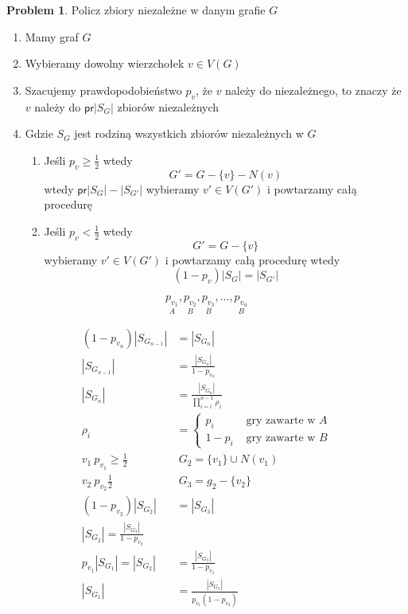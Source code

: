 \documentclass[a4paper,12pt]{article}
\theoremstyle{definition}%
\theoremstyle{definition}
\theoremstyle{problem}
\newtheorem*{problem*}{Problem}
\begin{document}
\begin{problem*}
Policz zbiory niezależne w danym grafie $G$
\begin{enumerate}
\item Mamy graf $G$
\item Wybieramy dowolny wierzchołek $v\in V(G)$
\item Szacujemy prawdopodobieństwo $p_v$, że $v$ należy do niezależnego, to znaczy że $v$ należy do $\mathsf{pr}|S_G|$ zbiorów niezależnych \
\item Gdzie $S_G$ jest rodziną wszystkich zbiorów niezależnych w $G$
\begin{enumerate}[label=\Alph*)]
\item Jeśli $p_v\geq \frac{1}{2}$ wtedy $$G'=G- \{v\}-N(v)$$ wtedy $\mathsf{pr}|S_G|-|S_{G'}|$ wybieramy $v'\in V(G')$ i powtarzamy całą procedurę
\item Jeśli $p_v < \frac{1}{2}$ wtedy $$G'=G- \{v\}$$ wybieramy $v'\in V(G')$ i powtarzamy całą procedurę wtedy $$(1-p_v)|S_G|=|S_{G'}|$$
\end{enumerate}
\end{enumerate}
$$\underset{A}{p_{v_1}},\underset{B}{p_{v_2}},\underset{B}{p_{v_3}},...,\underset{B}{p_{v_n}}$$
\begin{figure}[H]
\centering
{}
\end{figure}
\begin{align*}
(1-p_{v_n})|S_{G_{n-1}}|&=|S_{G_n}|\\
|S_{G_{n-1}}|&=\frac{|S_{G_n}|}{1-p_{v_n}}\\
|S_{G_n}|&=\frac{|S_{G_n}|}{\prod_{i=i}^{n-1}\rho _i}\\
\rho _i &= \left\{\begin{matrix}
p_i & \text{ gry zawarte w } A\\
1-p_i &  \text{ gry zawarte w } B
\end{matrix}\right.\\
v_1\ p_{v_1}\geq \frac{1}{2}\ &\ G_2=\{v_1\}\cup N(v_1)\\
v_2\ p_{v_2}\frac{1}{2}\ &\ G_3=g_2- \{v_2\}\\
(1-p_{v_2})|S_{G_2}|&=|S_{G_3}|\\
|S_{G_2}|=\frac{|S_{G_3}|}{1-p_{v_2}}\\
p_{v_1}|S_{G_1}|=|S_{G_2}|&=\frac{|S_{G_3}|}{1-p_{v_2}}\\
|S_{G_1}|&=\frac{|S_{G_3}|}{p_{v_1}(1-p_{v_2})}
\end{align*}
\end{problem*}
\end{document}
